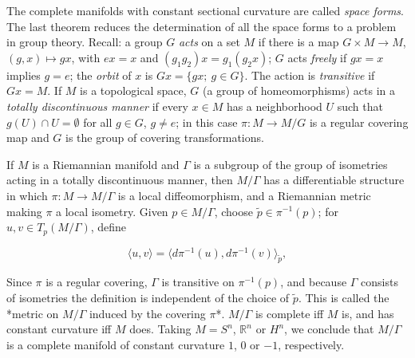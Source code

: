 \begin{lemma}
  The complete manifolds with constant sectional curvature are called \emph{space forms}.
  The last theorem reduces the determination of all the space forms to a problem in
  group theory. Recall: a group $G$ \emph{acts} on a set $M$ if there is a map
  $G\times M\to M$, $(g,x)\mapsto gx$, with $ex=x$ and $(g_1 g_2)x=g_1(g_2 x)$; $G$
  acts \emph{freely} if $gx=x$ implies $g=e$; the \emph{orbit} of $x$ is $Gx=\{gx;\ g\in G\}$.
  The action is \emph{transitive} if $Gx=M$. If $M$ is a topological space, $G$ (a group
  of homeomorphisms) acts in a \emph{totally discontinuous manner} if every $x\in M$ has a
  neighborhood $U$ such that $g(U)\cap U=\emptyset$ for all $g\in G$, $g\neq e$; in
  this case $\pi:M\to M/G$ is a regular covering map and $G$ is the group of covering
  transformations.
  
  If $M$ is a Riemannian manifold and $\Gamma$ is a subgroup of the group of
  isometries acting in a totally discontinuous manner, then $M/\Gamma$ has a
  differentiable structure in which $\pi:M\to M/\Gamma$ is a local diffeomorphism,
  and a Riemannian metric making $\pi$ a local isometry. Given $p\in M/\Gamma$,
  choose $\tilde p\in\pi^{-1}(p)$; for $u,v\in T_p(M/\Gamma)$, define
  
  $$
  \langle u,v\rangle=\langle d\pi^{-1}(u),d\pi^{-1}(v)\rangle_{\tilde{p}},
  $$
  
  Since $\pi$ is a regular covering, $\Gamma$ is transitive on $\pi^{-1}(p)$, and
  because $\Gamma$ consists of isometries the definition is independent of the
  choice of $\tilde p$. This is called the *metric on $M/\Gamma$ induced by the
  covering $\pi$*. $M/\Gamma$ is complete iff $M$ is, and has constant curvature iff
  $M$ does. Taking $M=S^n$,
  $\mathbb{R}^n$ or $H^n$, we conclude that $M/\Gamma$ is a complete manifold of
  constant curvature $1$, $0$ or $-1$, respectively.
\end{lemma}

